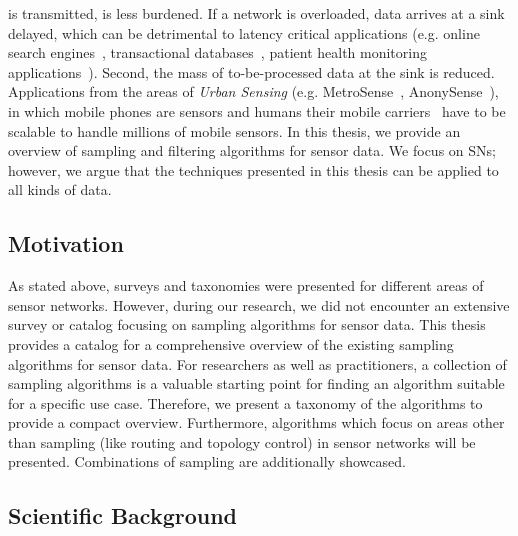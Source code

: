is transmitted, is less burdened. If a network is overloaded, data arrives at a
sink delayed, which can be detrimental to latency critical applications (e.g.
online search engines~\cite{kasture2016tailbench}, transactional
databases~\cite{kasture2016tailbench}, patient health monitoring
applications~\cite{abdullah2015real}). Second, the mass of to-be-processed data
at the sink is reduced. Applications from the areas of \textit{Urban Sensing}
(e.g. MetroSense~\cite{campbell2006people},
AnonySense~\cite{cornelius2008anonysense}), in which mobile phones are sensors
and humans their mobile carriers~\cite{calabrese2015urban, shin2009deamon} have
to be scalable to handle millions of mobile sensors. In this thesis, we provide
an overview of sampling and filtering algorithms for sensor data. We focus on
\acp{SN}; however, we argue that the techniques presented in this thesis can be
applied to all kinds of data. 


\subsection{Motivation}
\label{sec:motivation}

As stated above, surveys and taxonomies were presented for different areas of
sensor networks. However, during our research, we did not encounter an
extensive survey or catalog focusing on sampling algorithms for sensor data.
This thesis provides a catalog for a comprehensive overview of the existing
sampling algorithms for sensor data. For researchers as well as practitioners,
a collection of sampling algorithms is a valuable starting point for finding an
algorithm suitable for a specific use case. Therefore, we present a taxonomy of
the algorithms to provide a compact overview. Furthermore, algorithms which
focus on areas other than sampling (like routing and topology control) in
sensor networks will be presented. Combinations of sampling are additionally
showcased.

\subsection{Scientific Background}
\label{sec:Scientific Background}

